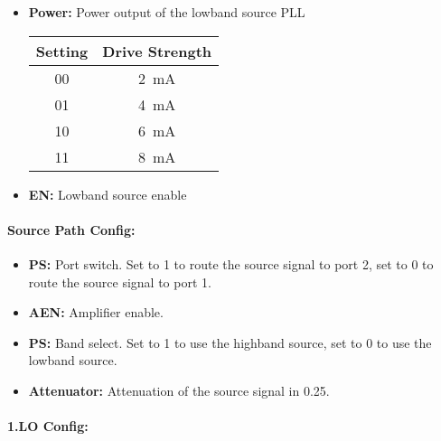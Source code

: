 \documentclass[a4paper,11pt]{article}
\newcommand{\bitrect}[2]{
  \begin{pgfonlayer}{foreground}
    \draw [thick] (0,0) rectangle (#1,1);
    \pgfmathsetmacro\result{#1-1}
    \foreach \x in {1,...,\result}
      \draw [thick] (\x,1) -- (\x, 0.8);
  \end{pgfonlayer}
  \bitlabels{#1}{#2}
}
\newcommand{\rwbits}[3]{
  \draw [thick] (#1,0) rectangle ++(#2,1) node[pos=0.5]{#3};
  \pgfmathsetmacro\start{#1+0.5}
  \pgfmathsetmacro\finish{#1+#2-0.5}
}
\newcommand{\robits}[3]{
  \begin{pgfonlayer}{background}
    \draw [thick, fill=lightgray] (#1,0) rectangle ++(#2,1) node[pos=0.5]{#3};
  \end{pgfonlayer}
  \pgfmathsetmacro\start{#1+0.5}
  \pgfmathsetmacro\finish{#1+#2-0.5}
}
\newcommand{\bitlabels}[2]{
  \foreach \bit in {1,...,#1}{
     \pgfmathsetmacro\result{#2}
     \node [above] at (\bit-0.5, 1) {\pgfmathprintnumber{\result}};
   }
}
\begin{document}
\begin{itemize}
\item \textbf{Power:} Power output of the lowband source PLL
\begin{center}
\begin{tabular}{ c|c }
Setting & Drive Strength\\
 \hline
00 & \SI{2}{\milli\ampere} \\
01 & \SI{4}{\milli\ampere}\\
10 & \SI{6}{\milli\ampere}\\
11 &  \SI{8}{\milli\ampere}\\
\end{tabular}
\end{center}
\item \textbf{EN:} Lowband source enable
\end{itemize}

\paragraph{Source Path Config:}
\begin{center}
\end{center}

\begin{itemize}
\item \textbf{PS:} Port switch. Set to 1 to route the source signal to port 2, set to 0 to route the source signal to port 1.
\item \textbf{AEN:} Amplifier enable.
\item \textbf{PS:} Band select. Set to 1 to use the highband source, set to 0 to use the lowband source.
\item \textbf{Attenuator:} Attenuation of the source signal in \SI{0.25}{\dBm}.
\end{itemize}

\paragraph{1.LO Config:}
\begin{center}
\end{center}
\end{document}
